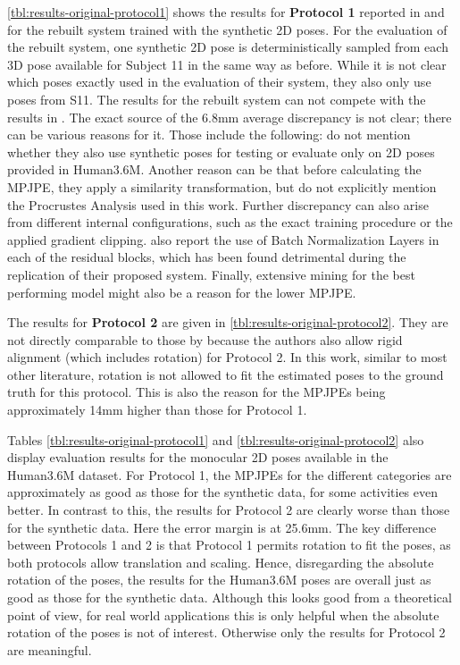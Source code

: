 \autoref{tbl:results-original-protocol1} shows the results for \textbf{Protocol 1} reported in \cite{drover18} and for the rebuilt system trained with the synthetic 2D poses.
For the evaluation of the rebuilt system, one synthetic 2D pose is deterministically sampled from each 3D pose available for Subject 11 in the same way as before.
While it is not clear which poses \citet{drover18} exactly used in the evaluation of their system, they also only use poses from S11.
The results for the rebuilt system can not compete with the results in \cite{drover18}.
The exact source of the 6.8mm average discrepancy is not clear; there can be various reasons for it.
Those include the following:
\citet{drover18} do not mention whether they also use synthetic poses for testing or evaluate only on 2D poses provided in Human3.6M.
Another reason can be that before calculating the MPJPE, they apply a similarity transformation, but do not explicitly mention the Procrustes Analysis used in this work.
Further discrepancy can also arise from different internal configurations, such as the exact training procedure or the applied gradient clipping.
\citet{drover18} also report the use of Batch Normalization Layers in each of the residual blocks, which has been found detrimental during the replication of their proposed system.
Finally, extensive mining for the best performing model might also be a reason for the lower MPJPE.

The results for \textbf{Protocol 2} are given in \autoref{tbl:results-original-protocol2}.
They are not directly comparable to those by \citet{drover18} because the authors also allow rigid alignment (which includes rotation) for Protocol 2.
In this work, similar to most other literature, rotation is not allowed to fit the estimated poses to the ground truth for this protocol.
This is also the reason for the MPJPEs being approximately 14mm higher than those for Protocol 1.

Tables \ref{tbl:results-original-protocol1} and \ref{tbl:results-original-protocol2} also display evaluation results for the monocular 2D poses available in the Human3.6M dataset.
For Protocol 1, the MPJPEs for the different categories are approximately as good as those for the synthetic data, for some activities even better.
In contrast to this, the results for Protocol 2 are clearly worse than those for the synthetic data.
Here the error margin is at 25.6mm.
The key difference between Protocols 1 and 2 is that Protocol 1 permits rotation to fit the poses, as both protocols allow translation and scaling.
Hence, disregarding the absolute rotation of the poses, the results for the Human3.6M poses are overall just as good as those for the synthetic data.
Although this looks good from a theoretical point of view, for real world applications this is only helpful when the absolute rotation of the poses is not of interest.
Otherwise only the results for Protocol 2 are meaningful.

